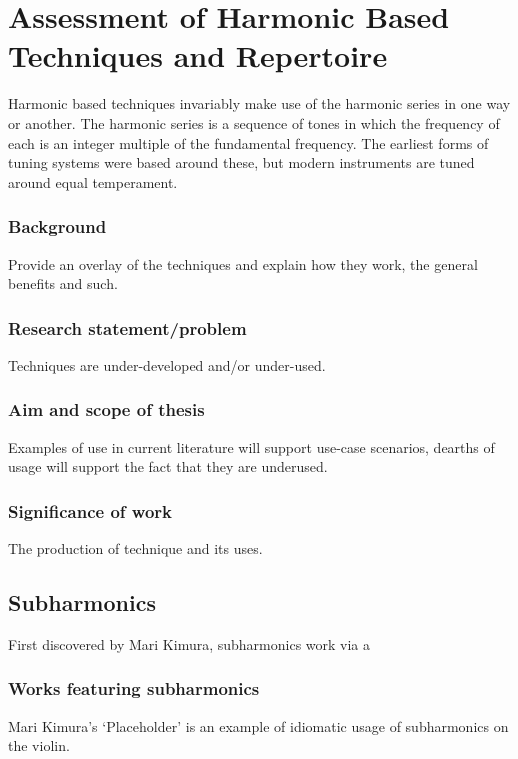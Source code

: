 
\chapter{Assessment of Harmonic Based Techniques and Repertoire}

Harmonic based techniques invariably make use of the harmonic series in one way or another. The harmonic series is a sequence of tones in which the frequency of each is an integer multiple of the fundamental frequency. The earliest forms of tuning systems were based around these, but modern instruments are tuned around equal temperament.

\subsection{Background}
Provide an overlay of the techniques and explain how they work, the general benefits and such.
\subsection{Research statement/problem}
Techniques are under-developed and/or under-used.

\subsection{Aim and scope of thesis}
Examples of use in current literature will support use-case scenarios, dearths of usage will support the fact that they are underused.

\subsection{Significance of work}
The production of technique and its uses.

\section{Subharmonics}
First discovered by Mari Kimura, subharmonics work via a \lipsum[3]\autocite{kimuraHowProduceSubharmonics1999} 

\subsection{Works featuring subharmonics}
Mari Kimura's `Placeholder' is an example of idiomatic usage of subharmonics on the violin. \lipsum[3]

